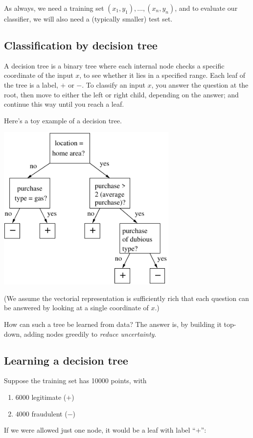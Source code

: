 As always, we need a training set $(x_1,y_1), \ldots, (x_n,y_n)$, and to evaluate our
classifier, we will also need a (typically smaller) test set.

\subsection{Classification by decision tree}

A decision tree is a binary tree where each internal node checks a specific coordinate
of the input $x$, to see whether it lies in a specified range. Each leaf of the tree
is a label, $+$ or $-$. To classify an input $x$, you answer the question at the root,
then move to either the left or right child, depending on the answer; and continue this
way until you reach a leaf.

Here's a toy example of a decision tree.

\begin{center}
\includegraphics[width=3.5in]{figs/decision.pdf}
\end{center}

\noindent
(We assume the vectorial representation is sufficiently rich that each question can be 
answered by looking at a single coordinate of $x$.) 

How can such a tree be learned from data? The answer is, by building it top-down,
adding nodes greedily to {\it reduce uncertainty}.

\subsection{Learning a decision tree}

Suppose the training set has 10000 points, with
\begin{enumerate}
\item[] $6000$ legitimate ($+$)
\item[] $4000$ fraudulent ($-$)
\end{enumerate}
If we were allowed just one node, it would be a leaf with label ``$+$'':

